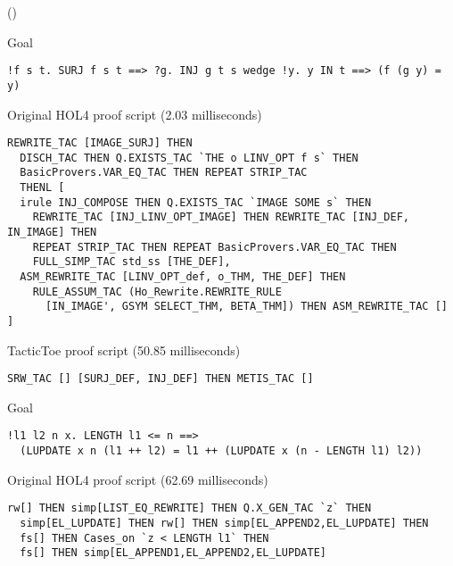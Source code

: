 \documentclass[runningheads,a4paper,draft]{svjour3}
\def\holfour{\textsf{HOL4}\xspace}
\def\tactictoe{\textsf{TacticToe}\xspace}
\begin{document}
\begin{example}\label{ex:casestudy}()



\vspace{5mm}
\small


Goal
\begin{lstlisting}[language=SMLSmall,frame=tb]
!f s t. SURJ f s t ==> ?g. INJ g t s wedge !y. y IN t ==> (f (g y) = y)
\end{lstlisting}

Original \holfour proof script (2.03 milliseconds)
\begin{lstlisting}[language=SMLSmall,frame=tb]
REWRITE_TAC [IMAGE_SURJ] THEN
  DISCH_TAC THEN Q.EXISTS_TAC `THE o LINV_OPT f s` THEN
  BasicProvers.VAR_EQ_TAC THEN REPEAT STRIP_TAC
  THENL [
  irule INJ_COMPOSE THEN Q.EXISTS_TAC `IMAGE SOME s` THEN
    REWRITE_TAC [INJ_LINV_OPT_IMAGE] THEN REWRITE_TAC [INJ_DEF, IN_IMAGE] THEN
    REPEAT STRIP_TAC THEN REPEAT BasicProvers.VAR_EQ_TAC THEN
    FULL_SIMP_TAC std_ss [THE_DEF],
  ASM_REWRITE_TAC [LINV_OPT_def, o_THM, THE_DEF] THEN
    RULE_ASSUM_TAC (Ho_Rewrite.REWRITE_RULE
      [IN_IMAGE', GSYM SELECT_THM, BETA_THM]) THEN ASM_REWRITE_TAC [] ]
\end{lstlisting}

\vspace{5mm}

\tactictoe proof script (50.85 milliseconds)
\begin{lstlisting}[language=SMLSmall,frame=tb]
SRW_TAC [] [SURJ_DEF, INJ_DEF] THEN METIS_TAC []
\end{lstlisting}




Goal
\begin{lstlisting}[language=SMLSmall,frame=tb]
!l1 l2 n x. LENGTH l1 <= n ==> 
  (LUPDATE x n (l1 ++ l2) = l1 ++ (LUPDATE x (n - LENGTH l1) l2))
\end{lstlisting}

\vspace{5mm}

Original \holfour proof script (62.69 milliseconds)
\begin{lstlisting}[language=SMLSmall,frame=tb]
  rw[] THEN simp[LIST_EQ_REWRITE] THEN Q.X_GEN_TAC `z` THEN
  simp[EL_LUPDATE] THEN rw[] THEN simp[EL_APPEND2,EL_LUPDATE] THEN
  fs[] THEN Cases_on `z < LENGTH l1` THEN
  fs[] THEN simp[EL_APPEND1,EL_APPEND2,EL_LUPDATE]
\end{lstlisting}


\end{example}
\end{document}
